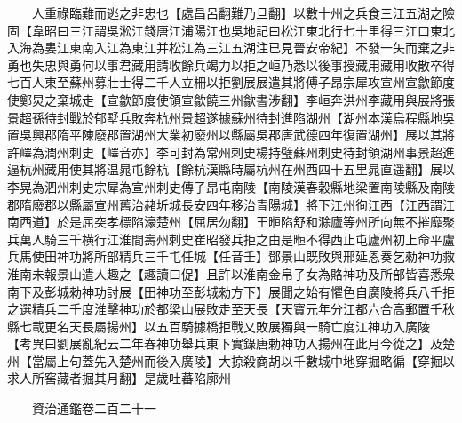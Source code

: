 　　人重祿臨難而逃之非忠也【處昌呂翻難乃旦翻】以數十州之兵食三江五湖之險固【韋昭曰三江謂吳淞江錢唐江浦陽江也吳地記曰松江東北行七十里得三江口東北入海為婁江東南入江為東江并松江為三江五湖注已見晉安帝紀】不發一矢而棄之非勇也失忠與勇何以事君藏用請收餘兵竭力以拒之峘乃悉以後事授藏用藏用收散卒得七百人東至蘇州募壯士得二千人立柵以拒劉展展遣其將傅子昂宗犀攻宣州宣歙節度使鄭炅之棄城走【宣歙節度使領宣歙饒三州歙書涉翻】李峘奔洪州李藏用與展將張景超孫待封戰於郁墅兵敗奔杭州景超遂據蘇州待封進陷湖州【湖州本漢烏程縣地吳置吳興郡隋平陳廢郡置湖州大業初廢州以縣屬吳郡唐武德四年復置湖州】展以其將許嶧為潤州刺史【嶧音亦】李可封為常州刺史楊持璧蘇州刺史待封領湖州事景超進逼杭州藏用使其將温晁屯餘杭【餘杭漢縣時屬杭州在州西四十五里晁直遥翻】展以李晃為泗州刺史宗犀為宣州刺史傳子昂屯南陵【南陵漢春穀縣地梁置南陵縣及南陵郡隋廢郡以縣屬宣州舊治赭圻城長安四年移治青陽城】將下江州徇江西【江西謂江南西道】於是屈突孝標陷濠楚州【屈居勿翻】王暅陷舒和滁廬等州所向無不摧靡聚兵萬人騎三千横行江淮間壽州刺史崔昭發兵拒之由是暅不得西止屯廬州初上命平盧兵馬使田神功將所部精兵三千屯任城【任音壬】鄧景山既敗與邢延恩奏乞勑神功救淮南未報景山遣人趣之【趣讀曰促】且許以淮南金帛子女為賂神功及所部皆喜悉衆南下及彭城勑神功討展【田神功至彭城勑方下】展聞之始有懼色自廣陵將兵八千拒之選精兵二千度淮擊神功於都梁山展敗走至天長【天寶元年分江都六合高郵置千秋縣七載更名天長屬揚州】以五百騎據橋拒戰又敗展獨與一騎亡度江神功入廣陵　【考異曰劉展亂紀云二年春神功舉兵東下實錄唐勅神功入揚州在此月今從之】及楚州【當屬上句蓋先入楚州而後入廣陵】大掠殺商胡以千數城中地穿掘略徧【穿掘以求人所窖藏者掘其月翻】是歲吐蕃陷廓州

　　資治通鑑卷二百二十一


    


 


 



 

 
  







 


　　
　　
　
　
　


　　

　















